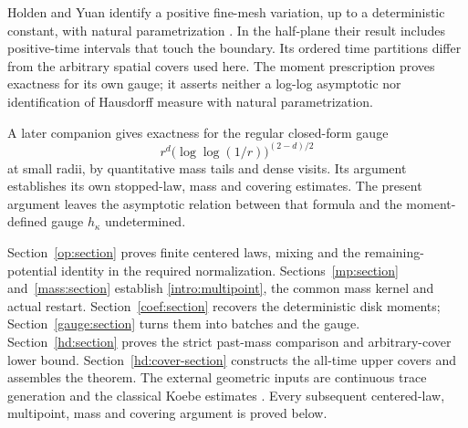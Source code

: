 Holden and Yuan identify a positive fine-mesh variation, up to a
deterministic constant, with natural parametrization
\cite[Theorems~1.7--1.8]{HoldenYuan2026}. In the half-plane their
result includes positive-time intervals that touch the boundary.
Its ordered time partitions differ from the arbitrary spatial covers
used here. The moment prescription proves exactness for its own gauge;
it asserts neither a log-log asymptotic nor identification of Hausdorff
measure with natural parametrization.

A later companion \cite[Theorem~1.1]{OpenAI2026Explicit} gives
exactness for the regular closed-form gauge
\[
 r^d\bigl(\log\log(1/r)\bigr)^{(2-d)/2}
\]
at small radii, by quantitative mass tails and dense visits.
Its argument establishes its own stopped-law, mass and covering estimates.
The present argument leaves the asymptotic relation between that formula
and the moment-defined gauge $h_\kappa$ undetermined.

Section~\ref{op:section} proves finite centered laws, mixing and the
remaining-potential identity in the required normalization.
Sections~\ref{mp:section} and~\ref{mass:section} establish
\eqref{intro:multipoint}, the common mass kernel and actual restart.
Section~\ref{coef:section} recovers the deterministic disk moments;
Section~\ref{gauge:section} turns them into batches and the gauge.
Section~\ref{hd:section} proves the strict past-mass comparison and
arbitrary-cover lower bound. Section~\ref{hd:cover-section} constructs
the all-time upper covers and assembles the theorem.
The external geometric inputs are continuous trace generation
\cite[Theorem~5.1]{RohdeSchramm2005} and the classical Koebe estimates
\cite[Section~3.2]{Beliaev2015Notes}. Every subsequent centered-law,
multipoint, mass and covering argument is proved below.
